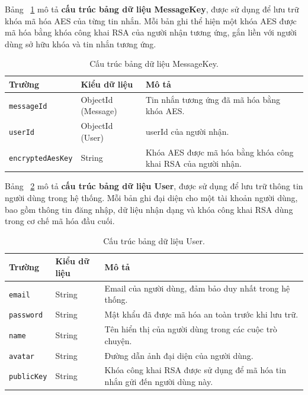 \indent Bảng ~\ref{tab:messagekey} mô tả \textbf{cấu trúc bảng dữ liệu MessageKey}, được sử dụng để lưu trữ khóa mã hóa AES của từng tin nhắn.  
Mỗi bản ghi thể hiện một khóa AES được mã hóa bằng khóa công khai RSA của người nhận tương ứng, gắn liền với người dùng sở hữu khóa và tin nhắn tương ứng.

\begin{table}[H]
\centering
\caption{Cấu trúc bảng dữ liệu MessageKey.}
\label{tab:messagekey}
\begin{tabularx}{\textwidth}{|p{4cm}|p{3cm}|X|}
\hline
\textbf{Trường} & \textbf{Kiểu dữ liệu} & \textbf{Mô tả} \\ \hline
\texttt{messageId} & ObjectId (Message) & Tin nhắn tương ứng đã mã hóa bằng khóa AES. \\ \hline
\texttt{userId} & ObjectId (User) & userId của người nhận. \\ \hline
\texttt{encryptedAesKey} & String & Khóa AES được mã hóa bằng khóa công khai RSA của người nhận. \\ \hline
\end{tabularx}
\end{table}

\indent Bảng ~\ref{tab:user} mô tả \textbf{cấu trúc bảng dữ liệu User}, được sử dụng để lưu trữ thông tin người dùng trong hệ thống.  
Mỗi bản ghi đại diện cho một tài khoản người dùng, bao gồm thông tin đăng nhập, dữ liệu nhận dạng và khóa công khai RSA dùng trong cơ chế mã hóa đầu cuối.

\begin{table}[H]
\centering
\caption{Cấu trúc bảng dữ liệu User.}
\label{tab:user}
\begin{tabularx}{\textwidth}{|p{3cm}|p{3cm}|X|}
\hline
\textbf{Trường} & \textbf{Kiểu dữ liệu} & \textbf{Mô tả} \\ \hline
\texttt{email} & String & Email của người dùng, đảm bảo duy nhất trong hệ thống. \\ \hline
\texttt{password} & String & Mật khẩu đã được mã hóa an toàn trước khi lưu trữ. \\ \hline
\texttt{name} & String & Tên hiển thị của người dùng trong các cuộc trò chuyện. \\ \hline
\texttt{avatar} & String & Đường dẫn ảnh đại diện của người dùng. \\ \hline
\texttt{publicKey} & String & Khóa công khai RSA được sử dụng để mã hóa tin nhắn gửi đến người dùng này. \\ \hline
\end{tabularx}
\end{table}

